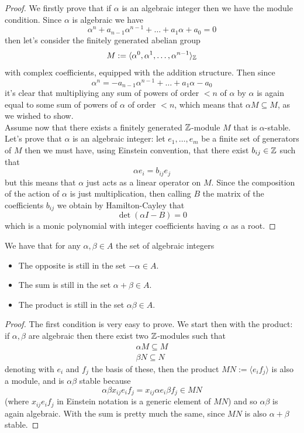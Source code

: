 \documentclass[11pt]{scrartcl}
\begin{document}
	\begin{proof}
		We firstly prove that if $\alpha$ is an algebraic integer then we have the module condition. Since $\alpha$ is algebraic we have
		$$\alpha^n + a_{n-1}\alpha^{n-1}+\dots+a_1\alpha + a_0=0$$
		then let's consider the finitely generated abelian group
		$$M:=\langle \alpha^0,\alpha^1,\dots,\alpha^{n-1}\rangle_{\mathbb Z}$$
		with complex coefficients, equipped with the addition structure. Then since 
		$$\alpha^n=-a_{n-1}\alpha^{n-1}+\dots+a_1\alpha -a_0$$
		it's clear that multipliying any sum of powers of order $<n$ of $\alpha$ by $\alpha$ is again equal to some sum of powers of $\alpha$ of order $<n$, which means that $\alpha M \subseteq M$, as we wished to show. \\
		Assume now that there exists a finitely generated $\mathbb Z$-module $M$ that is $\alpha$-stable. Let's prove that $\alpha$ is an algebraic integer: let $e_1,\dots,e_m$ be a finite set of generators of $M$ then we must have, using Einstein convention, that there exist $b_{ij}\in \mathbb Z$ such that
		$$\alpha e_i = b_{ij}e_j$$
		but this means that $\alpha$ just acts as a linear operator on $M$. Since the composition of the action of $\alpha$ is just multiplication, then calling $B$ the matrix of the coefficients $b_{ij}$ we obtain by Hamilton-Cayley that
		$$\det\left(\alpha I-B\right)=0$$
		which is a monic polynomial with integer coefficients having $\alpha$ as a root.
	\end{proof}
	\begin{proposition}
		We have that for any $\alpha,\beta\in A$ the set of algebraic integers
		\begin{itemize}
			\item The opposite is still in the set $-\alpha\in A$.
			\item The sum is still in the set $\alpha+\beta\in A$.
			\item The product is still in the set
			$\alpha\beta\in A$.
		\end{itemize}
	\end{proposition}
	\begin{proof}
		The first condition is very easy to prove. We start then with the product: if $\alpha,\beta$ are algebraic then there exist two $\mathbb Z$-modules such that
		\begin{gather*}
			\alpha M \subseteq M \\
			\beta N \subseteq N
		\end{gather*}
		denoting with $e_i$ and $f_j$ the basis of these, then the product $MN:=\langle e_if_j\rangle$ is also a module, and is $\alpha \beta$ stable because
		$$\alpha \beta x_{ij}e_if_j=x_{ij}\alpha e_i \beta f_j \in MN$$
		(where $x_{ij}e_if_j$ in Einstein notation is a generic element of $MN$) and so $\alpha\beta$ is again algebraic. With the sum is pretty much the same, since $MN$ is also $\alpha+\beta$ stable.
	\end{proof}
\end{document}
